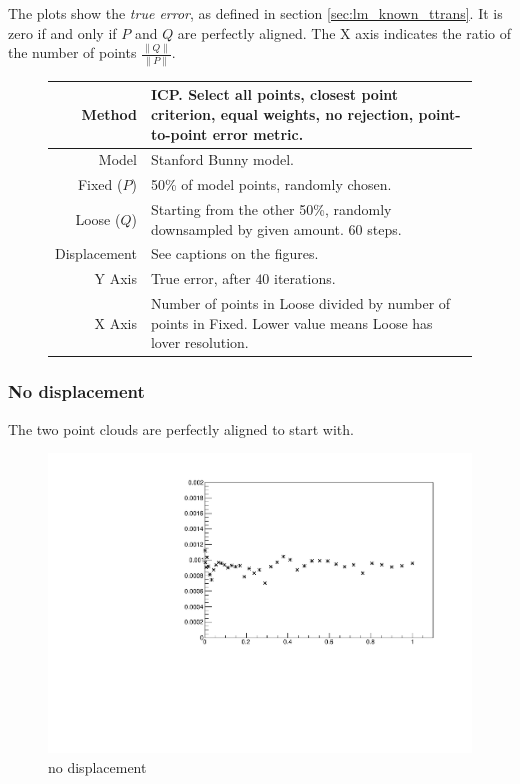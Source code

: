 The plots show the \emph{true error}, as defined in section \ref{sec:lm_known_ttrans}. It is zero if and only if $P$ and $Q$ are perfectly aligned. The X axis indicates the ratio of the number of points $\frac{\|Q\|}{\|P\|}$.

\begin{figure}[H]
\begin{tabularx}{\textwidth}{|r|X|} \hline
Method & ICP. Select all points, closest point criterion, equal weights, no rejection, point-to-point error metric. \\ \hline
Model & Stanford Bunny model. \\ \hline
Fixed ($P$) & 50\% of model points, randomly chosen. \\ \hline
Loose ($Q$) & Starting from the other 50\%, randomly downsampled by given amount. $60$ steps. \\ \hline
Displacement & See captions on the figures. \\ \hline
Y Axis & True error, after $40$ iterations. \\\hline
X Axis & Number of points in Loose divided by number of points in Fixed. Lower value means Loose has lover resolution. \\ \hline
\end{tabularx}
\end{figure}

\subsubsection{No displacement}
The two point clouds are perfectly aligned to start with.

\begin{figure}[H]
\centering
\includegraphics[width=.7\textwidth]{fig/bunny_globmin.pdf}
\caption{no displacement}
\label{fig:bunny_globmin}
\end{figure}

